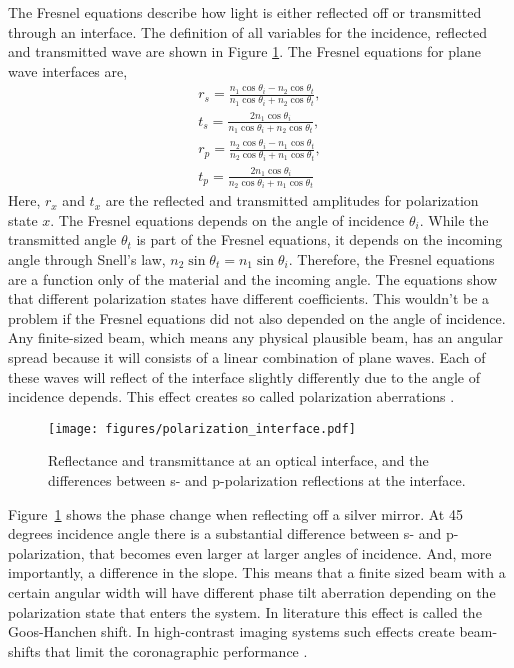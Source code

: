 \documentclass[letterpaper]{ar-1col}
\begin{document}
The Fresnel equations describe how light is either reflected off or transmitted through an interface.
%
The definition of all variables for the incidence, reflected and transmitted wave are shown in Figure \ref{fig:fresnel_equations}. The Fresnel equations for plane wave interfaces are,
\begin{align}
r_s = \frac{n_1\cos{\theta_i} - n_2\cos{\theta_t}}{n_1\cos{\theta_i} + n_2\cos{\theta_t}},\\
t_s = \frac{2n_1 \cos{\theta_i}}{n_1\cos{\theta_i} + n_2\cos{\theta_t}},\\
r_p = \frac{n_2\cos{\theta_i} - n_1\cos{\theta_t}}{n_2\cos{\theta_i} + n_1\cos{\theta_t}},\\
t_p = \frac{2n_1 \cos{\theta_i}}{n_2\cos{\theta_i} + n_1\cos{\theta_t}}
\end{align}
Here, $r_x$ and $t_x$ are the reflected and transmitted amplitudes for polarization state $x$.
%
The Fresnel equations depends on the angle of incidence $\theta_i$.
%
While the transmitted angle $\theta_t$ is part of the Fresnel equations, it depends on the incoming angle through Snell's law, $n_2 \sin \theta_t = n_1 \sin \theta_i$.
%
Therefore, the Fresnel equations are a function only of the material and the incoming angle.
%
The equations show that different polarization states have different coefficients.
%
This wouldn't be a problem if the Fresnel equations did not also depended on the angle of incidence.
%
Any finite-sized beam, which means any physical plausible beam, has an angular spread because it will consists of a linear combination of plane waves.
%
Each of these waves will reflect of the interface slightly differently due to the angle of incidence depends.
%
This effect creates so called polarization aberrations \citep{Chipman89, Breckinridge15}.

\begin{figure}[ht]
  \centering
  \texttt{[image: figures/polarization\_interface.pdf]}
  \caption{Reflectance and transmittance at an optical interface, and the differences between s- and p-polarization reflections at the interface.}
  \label{fig:fresnel_equations}
\end{figure}

Figure~\ref{fig:fresnel_equations} shows the phase change when reflecting off a silver mirror.
%
At 45 degrees incidence angle there is a substantial difference between s- and p-polarization, that becomes even larger at larger angles of incidence.
%
And, more importantly, a difference in the slope.
%
This means that a finite sized beam with a certain angular width will have different phase tilt aberration depending on the polarization state that enters the system.
%
In literature this effect is called the Goos-Hanchen shift.
%
In high-contrast imaging systems such effects create beam-shifts that limit the coronagraphic performance \citep{Schmid18, millar2022polarization}.
\end{document}
